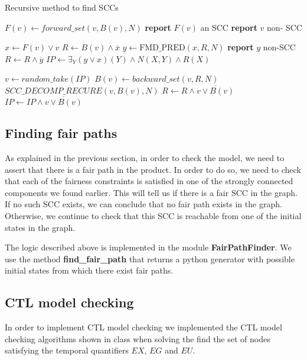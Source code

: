 \documentclass[11pt]{article}
\begin{document}
        \begin{algorithm}[H]
            \caption{Recursive method to find SCCs}\label{recursiveSCC}
                \State $F(v) \gets forward\_set(v, B(v), N)$
                    \State \textbf{report} $F(v)$ an SCC
                \Else
                    \State \textbf{report} $v$ non- SCC
                \EndIf

                \State $x \gets F(v) \vee v$
                \State $R \gets B(v) \wedge \overline{x}$
                \State $y \gets \text{FMD\_PRED}(x, R, N)$
                \State \textbf{report} $y$ non-SCC
                \State $R \gets R \wedge \overline{y}$
                \State $IP \gets \exists_Y (y\vee x)(Y)\wedge N(X,Y) \wedge R(X)$
                
                    \State $v \gets random\_take(IP)$
                    \State $B(v) \gets backward\_set(v, R, N)$
                    \State $SCC\_DECOMP\_RECURE(v, B(v), N)$
                    \State $R \gets R \wedge \overline{v \vee B(v)}$
                    \State $IP \gets IP \wedge \overline {v \vee B(v)}$

            \EndProcedure
        \end{algorithm}

    \subsection{Finding fair paths}
        As explained in the previous section, in order to check the model, we
        need to assert that there is a fair path in the product. In order to do 
        so, we need to check that each of the fairness constraints is satisfied
        in one of the strongly connected components we found earlier.
        This will tell us if there is a fair SCC in the graph. If no such SCC 
        exists, we can conclude that no fair path exists in the graph. Otherwise,
        we continue to check that this SCC is reachable from one of the initial
        states in the graph.
        
        The logic described above is implemented in the module 
        \textbf{FairPathFinder}. We use the method \textbf{find\_fair\_path}
        that returns a python generator with possible initial states from
        which there exist fair paths.

    \subsection{CTL model checking}
        In order to implement CTL model checking we implemented the CTL model
        checking algorithms shown in class when solving the find the set
        of nodes satisfying the temporal quantifiers $EX$, $EG$ and $EU$.
\end{document}
